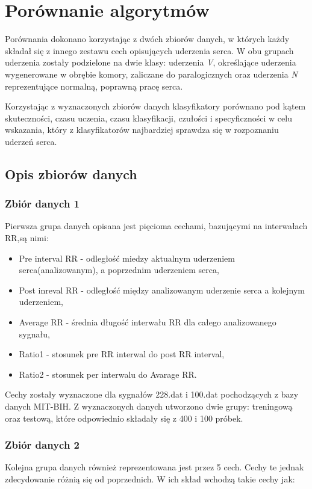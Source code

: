 \documentclass[[10pt,a4paper]{article}
\begin{document}
\section{Porównanie algorytmów}
Porównania dokonano korzystając z dwóch zbiorów danych, w których każdy składał się z innego zestawu cech opisujących uderzenia serca. W obu grupach uderzenia zostały podzielone na dwie klasy: uderzenia \textit{V}, określające uderzenia wygenerowane w obrębie komory, zaliczane do paralogicznych oraz uderzenia \textit{N} reprezentujące normalną, poprawną pracę serca. 

Korzystając z wyznaczonych zbiorów danych klasyfikatory porównano pod kątem skuteczności, czasu uczenia, czasu klasyfikacji, czułości i specyficzności w celu wskazania, który z klasyfikatorów najbardziej sprawdza się w rozpoznaniu uderzeń serca. 

\subsection{Opis zbiorów danych}
\subsubsection{Zbiór danych 1}
Pierwsza grupa danych opisana jest pięcioma cechami, bazującymi na interwałach RR,są nimi:
\begin{itemize}
\item Pre interval RR - odległość miedzy aktualnym uderzeniem serca(analizowanym), a poprzednim uderzeniem serca,
\item Post inreval RR  - odległość między analizowanym uderzenie serca a kolejnym uderzeniem,
\item Average RR - średnia długość interwału RR dla całego analizowanego sygnału,
\item Ratio1 - stosunek pre RR interwal do post RR interval,
\item Ratio2 - stosunek per interwalu do Avarage RR.
\end{itemize}

Cechy zostały wyznaczone dla sygnałów 228.dat i 100.dat pochodzących z bazy danych MIT-BIH. Z wyznaczonych danych utworzono dwie grupy: treningową oraz testową, które odpowiednio składały się z 400 i 100 próbek. 

\subsubsection{Zbiór danych 2}
Kolejna grupa danych również reprezentowana jest przez 5 cech. Cechy te jednak zdecydowanie różnią się od poprzednich. W ich skład wchodzą takie cechy jak:
\end{document}
